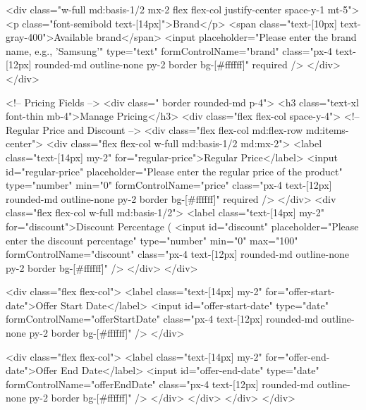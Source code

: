             <div class="w-full md:basis-1/2 mx-2 flex flex-col justify-center space-y-1 mt-5">
              <p class="font-semibold text-[14px]">Brand</p>
              <span class="text-[10px] text-gray-400">Available brand</span>
              <input placeholder="Please enter the brand name, e.g., 'Samsung'" type="text" formControlName="brand"
                class="px-4 text-[12px] rounded-md outline-none py-2 border bg-[#ffffff]" required />
            </div>
          </div>
  
          <!-- Pricing Fields -->
          <div class=" border rounded-md p-4">
            <h3 class="text-xl font-thin mb-4">Manage Pricing</h3>
            <div class="flex flex-col space-y-4">
              <!-- Regular Price and Discount -->
              <div class="flex flex-col md:flex-row md:items-center">
                <div class="flex flex-col w-full md:basis-1/2 md:mx-2">
                  <label class="text-[14px] my-2" for="regular-price">Regular Price</label>
                  <input id="regular-price" placeholder="Please enter the regular price of the product" type="number"
                    min="0" formControlName="price"
                    class="px-4 text-[12px] rounded-md outline-none py-2 border bg-[#ffffff]" required />
                </div>
                <div class="flex flex-col w-full md:basis-1/2">
                  <label class="text-[14px] my-2" for="discount">Discount Percentage (%
                  <input id="discount" placeholder="Please enter the discount percentage" type="number" min="0" max="100"
                    formControlName="discount"
                    class="px-4 text-[12px] rounded-md outline-none py-2 border bg-[#ffffff]" />
                </div>
              </div>
  
              <div class="flex flex-col">
                <label class="text-[14px] my-2" for="offer-start-date">Offer Start Date</label>
                <input id="offer-start-date" type="date" formControlName="offerStartDate"
                  class="px-4 text-[12px] rounded-md outline-none py-2 border bg-[#ffffff]" />
              </div>
  
              <div class="flex flex-col">
                <label class="text-[14px] my-2" for="offer-end-date">Offer End Date</label>
                <input id="offer-end-date" type="date" formControlName="offerEndDate"
                  class="px-4 text-[12px] rounded-md outline-none py-2 border bg-[#ffffff]" />
              </div>
            </div>
          </div>
        </div>
  
